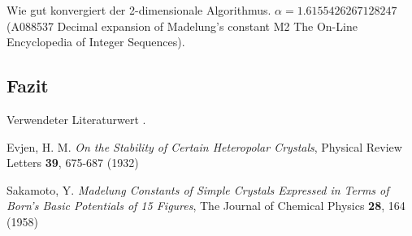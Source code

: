\documentclass[10pt,a4paper]{article}
\begin{document}
Wie gut konvergiert der 2-dimensionale Algorithmus.
$\alpha = 1.6155426267128247$ (A088537 Decimal expansion of Madelung's constant M2 The On-Line Encyclopedia of Integer Sequences).

\subsection{Fazit}

Verwendeter Literaturwert  .


\begin{thebibliography}{9}

Evjen, H. M.
\emph{On the Stability of Certain Heteropolar Crystals},
Physical Review Letters \textbf{39},
675-687 (1932)

Sakamoto, Y.
\emph{Madelung Constants of Simple Crystals Expressed in Terms of Born's Basic
Potentials of 15 Figures},
The Journal of Chemical Physics \textbf{28},
164 (1958)

\end{thebibliography}
\end{document}

